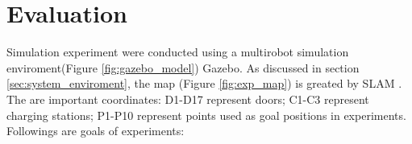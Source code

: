 \chapter{Evaluation}






Simulation experiment were conducted using a multirobot simulation enviroment(Figure \ref{fig:gazebo_model}) Gazebo. As discussed in section \ref{sec:system_enviroment}, the map (Figure \ref{fig:exp_map}) is greated by SLAM \cite{slam}. The are important coordinates: D1-D17 represent doors; C1-C3 represent charging stations; P1-P10 represent points used as goal positions in experiments.
Followings are goals of experiments:

